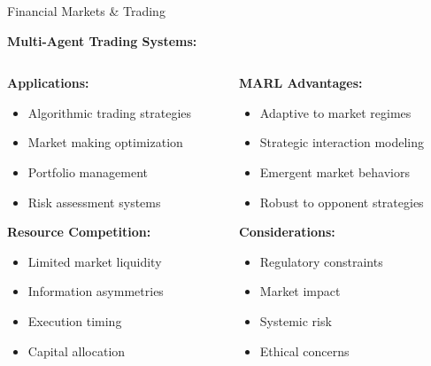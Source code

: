 \documentclass[aspectratio=169]{beamer}
\begin{document}
\begin{frame}{Financial Markets \& Trading}
    
    \textbf{Multi-Agent Trading Systems:} \autocite{shavandi_multi-agent_2022}
    
    \vfill
    
    \begin{columns}
        \begin{column}{0.5\textwidth}
            \textbf{Applications:}
            \begin{itemize}
                \item Algorithmic trading strategies
                \item Market making optimization
                \item Portfolio management
                \item Risk assessment systems
            \end{itemize}
            
            \vfill
            \textbf{Resource Competition:}
            \begin{itemize}
                \item Limited market liquidity
                \item Information asymmetries
                \item Execution timing
                \item Capital allocation
            \end{itemize}
        \end{column}
        \begin{column}{0.5\textwidth}
            \textbf{MARL Advantages:}
            \begin{itemize}
                \item Adaptive to market regimes
                \item Strategic interaction modeling
                \item Emergent market behaviors
                \item Robust to opponent strategies
            \end{itemize}
            
            \vfill
            \textbf{Considerations:}
            \begin{itemize}
                \item Regulatory constraints
                \item Market impact
                \item Systemic risk
                \item Ethical concerns
            \end{itemize}
        \end{column}
    \end{columns}
\end{frame}
\end{document}
